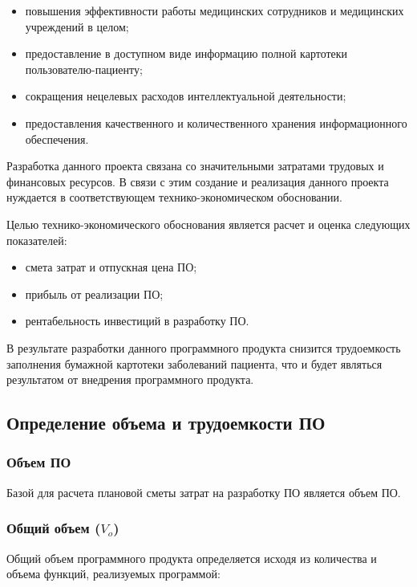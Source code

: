 \begin{itemize}
  \item повышения эффективности работы медицинских сотрудников и медицинских учреждений в целом;
  \item предоставление в доступном виде информацию полной картотеки пользователю-пациенту;
  \item сокращения нецелевых расходов интеллектуальной деятельности;
  \item предоставления качественного и количественного хранения информационного обеспечения.
\end{itemize}

Разработка данного проекта связана со значительными затратами трудовых и финансовых ресурсов. В связи с этим создание и реализация данного проекта нуждается в соответствующем технико-экономическом обосновании.

Целью технико-экономического обоснования является расчет и оценка следующих показателей:

\begin{itemize}
  \item смета затрат и отпускная цена ПО;
  \item прибыль от реализации ПО;
  \item рентабельность инвестиций в разработку ПО.
\end{itemize}

В результате разработки данного программного продукта снизится трудоемкость заполнения бумажной картотеки заболеваний пациента, что и будет являться результатом от внедрения программного продукта.

\subsection{Определение объема и трудоемкости ПО}

\subsubsection{Объем ПО}

Базой для расчета плановой сметы затрат на разработку ПО является объем ПО.   

\subsubsection{Общий объем ($ V_{o} $)}

Общий объем программного продукта определяется исходя из количества и объема функций, реализуемых программой:

